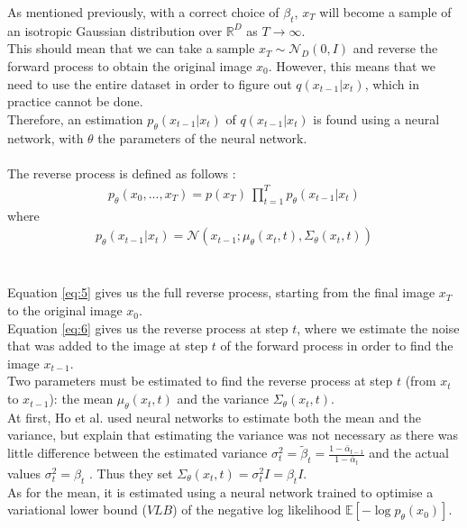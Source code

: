 \documentclass{article}
\begin{document}
As mentioned previously, with a correct choice of $\beta_t$, $x_T$ will become a sample of an isotropic Gaussian distribution over $\mathbb{R}^D$ as $T \rightarrow \infty$. \cite{nichol2021improved, sohldickstein2015deep} \\
This should mean that we can take a sample $x_T \sim \mathcal{N}_D \left(0, I\right)$ and reverse the forward process to obtain the original image $x_0$. 
However, this means that we need to use the entire dataset in order to figure out $q\left(x_{t-1} | x_t\right)$, which in practice cannot be done. \cite{nichol2021improved} \\
Therefore, an estimation $p_\theta (x_{t-1} | x_t)$ of $q(x_{t-1}|x_t)$ is found using a neural network, with $\theta$ the parameters of the neural network. \cite{nichol2021improved}
\\\\
The reverse process is defined as follows \cite{ho2020denoising}:
\begin{gather}
  p_{\theta}\left(x_0, ..., x_T\right) = p\left(x_T\right) \: \prod_{t=1}^T p_{\theta}\left(x_{t-1} | x_t\right)
\end{gather}
where
\begin{gather}
  p_{\theta}\left(x_{t-1} | x_t\right) = \mathcal{N}\left(x_{t-1}; \mu_{\theta}\left(x_t, t\right), \Sigma_{\theta}\left(x_t, t\right)\right)
\end{gather}
\\\\
Equation \ref{eq:5} gives us the full reverse process, starting from the final image $x_T$ to the original image $x_0$. \\
Equation \ref{eq:6} gives us the reverse process at step $t$, where we estimate the noise that was added to the image at step $t$ of the forward process in order to find the image $x_{t-1}$. \\
Two parameters must be estimated to find the reverse process at step $t$ (from $x_t$ to $x_{t-1}$): the mean $\mu_{\theta}\left(x_t, t\right)$ and the variance $\Sigma_{\theta}\left(x_t, t\right)$. \\
At first, Ho et al. \cite{ho2020denoising} used neural networks to estimate both the mean and the variance, but explain that estimating the variance was not necessary as there was little difference between the estimated variance $\sigma_t^2 = \tilde{\beta}_t = \frac{1 - \bar{\alpha}_{t-1}}{1 - \bar{\alpha}_t}$ and the actual values $\sigma_t^2 = \beta_t$ \cite{ho2020denoising}. Thus they set $\Sigma_{\theta}\left(x_t, t\right) = \sigma_t^2 I = \beta_t I$. \\
As for the mean, it is estimated using a neural network trained to optimise a variational lower bound ($VLB$) of the negative log likelihood $\mathbb{E}\left[- \log p_{\theta} \left(x_0\right)\right]$. \cite{ho2020denoising}
\end{document}
